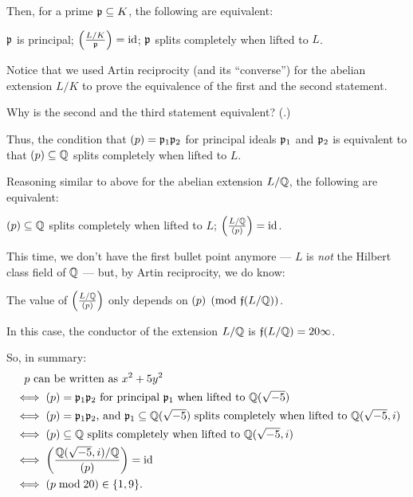 Then, for a prime $\mathfrak p \subseteq K$, the following are equivalent:
\begin{enumerate}
	\ii $\mathfrak p$ is principal;
	\ii $\left(\frac{L/K}{\mathfrak p}\right) = \mathrm{id}$;
	\ii $\mathfrak p$ splits completely when lifted to $L$.
\end{enumerate}

Notice that we used Artin reciprocity (and its ``converse'') for the abelian extension $L/K$
to prove the equivalence of the first and the second statement.
\begin{exercise}
	Why is the second and the third statement equivalent?
	(.)
\end{exercise}

Thus, the condition that $(p) = \mathfrak p_1 \mathfrak p_2$ for principal ideals $\mathfrak p_1$ and $\mathfrak p_2$ is equivalent
to that $(p) \subseteq \mathbb Q$ splits completely when lifted to $L$.

Reasoning similar to above for the abelian extension $L/\mathbb Q$, the following are equivalent:
\begin{enumerate}
	\ii $(p) \subseteq \mathbb Q$ splits completely when lifted to $L$;
	\ii $\left(\frac{L/\mathbb Q}{(p)}\right) = \mathrm{id}$.
\end{enumerate}

This time, we don't have the first bullet point anymore --- $L$ is \emph{not} the
Hilbert class field of $\mathbb Q$ --- but, by Artin reciprocity, we do know:
\begin{moral}
	The value of $\left(\frac{L/\mathbb Q}{(p)}\right)$ only depends on $(p) \pmod{\mathfrak f(L/\mathbb Q)}$.
\end{moral}
In this case, the conductor of the extension $L/\mathbb Q$ is $\mathfrak f(L/\mathbb Q) = 20 \infty$.

So, in summary:
\begin{align*}
	&\quad \text{$p$ can be written as $x^2 + 5y^2$} \\
	&\iff \text{$(p) = \mathfrak p_1 \mathfrak p_2$ for principal $\mathfrak p_1$ when lifted to $\mathbb Q(\sqrt{-5})$} \\
	&\iff \text{$(p) = \mathfrak p_1 \mathfrak p_2$, and $\mathfrak p_1 \subseteq \mathbb Q(\sqrt{-5})$ splits completely
		when lifted to $\mathbb Q(\sqrt{-5}, i)$} \\
	&\iff \text{$(p) \subseteq \mathbb Q$ splits completely when lifted to $\mathbb Q(\sqrt{-5}, i)$} \\
	&\iff \left( \frac{\mathbb Q(\sqrt{-5}, i)/\mathbb Q}{(p)} \right) = \mathrm{id} \\
	&\iff (p \bmod 20) \in \{ 1, 9 \}.
\end{align*}

